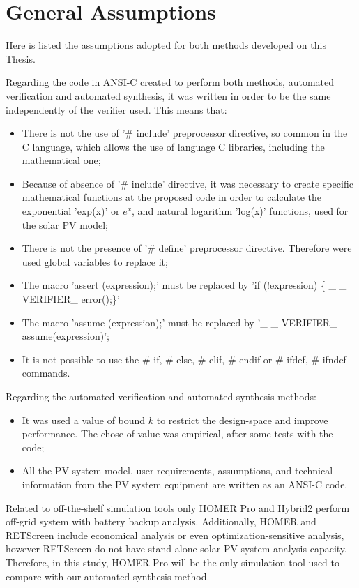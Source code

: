 \section{General Assumptions}

Here is listed the assumptions adopted for both methods developed on this Thesis.

Regarding the code in ANSI-C created to perform both methods, automated verification and automated synthesis, it was written in order to be the same independently of the verifier used. This means that: 

\begin{itemize}
\item There is not the use of '\# include' preprocessor directive, so common in the C language, which allows the use of language C libraries, including the mathematical one;
\item Because of absence of '\# include' directive, it was necessary to create specific mathematical functions at the proposed code in order to calculate the exponential 'exp(x)' or $e^{x}$, and natural logarithm 'log(x)' functions, used for the solar PV model;
\item There is not the presence of '\# define' preprocessor directive. Therefore were used global variables to replace it;
\item The macro 'assert (expression);' must be replaced by 'if (!expression) \{ \_ \_ VERIFIER\_ error();\}'
\item The macro 'assume (expression);' must be replaced by '\_ \_ VERIFIER\_ assume(expression)';
\item It is not possible to use the \# if, \# else, \# elif, \# endif or \# ifdef, \# ifndef commands.
\end{itemize}

Regarding the automated verification and automated synthesis methods:

\begin{itemize}
\item It was used a value of bound $k$ to restrict the design-space and improve performance. The chose of value was empirical, after some tests with the code;
\item All the PV system model, user requirements, assumptions, and technical information from the PV system equipment are written as an ANSI-C code.
\end{itemize}

Related to off-the-shelf simulation tools only HOMER Pro and Hybrid2 perform off-grid system with battery backup analysis. Additionally, HOMER and RETScreen include economical analysis or even optimization-sensitive analysis, however RETScreen do not have stand-alone solar PV system analysis capacity. Therefore, in this study, HOMER Pro will be the only simulation tool used to compare with our automated synthesis method.  

